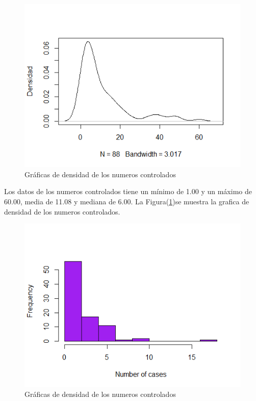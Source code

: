 \documentclass[12pt,a4paper]{article}
\begin{document}
\begin{figure}
	\centering
	\includegraphics[scale = 0.7]{ncontr.png}
	\caption{Gráficas de densidad de los numeros controlados} \label{fig:ncontr}
\end{figure}
Los datos de los numeros controlados tiene un mínimo de 1.00 y un máximo de 60.00, media de 11.08 y mediana de 6.00. La Figura(\ref{fig:ncontr})se muestra la grafica de densidad de los numeros controlados.
\begin{figure}
	\centering
	\includegraphics[scale = 0.7]{hist.png}
	\caption{Gráficas de densidad de los numeros controlados} \label{fig:hist}
\end{figure}
\end{document}
